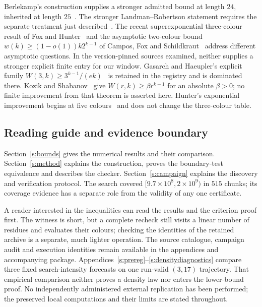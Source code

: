 Berlekamp's construction supplies a stronger admitted bound at length $24$,
inherited at length $25$~\cite{Berlekamp1968}. The stronger
Landman--Robertson statement requires the separate treatment just
described~\cite{LandmanRobertson2004,LandmanRobertson2014,Johannson2007}.
The recent superexponential three-colour result of Fox and
Hunter~\cite{FoxHunter2026} and the asymptotic two-colour bound
$w(k)\ge(1-o(1))k2^{k-1}$ of Campos, Fox and
Schildkraut~\cite{CamposFoxSchildkraut2026} address different asymptotic
questions. In the version-pinned sources examined, neither supplies a
stronger explicit finite entry for our window.
Gasarch and Haeupler's explicit family
$W(3,k)\ge3^{k-1}/(ek)$~\cite[Note~1.7(2)]{GasarchHaeupler2011} is retained
in the registry and is dominated there. Kozik and
Shabanov~\cite[Theorem~2 of the arXiv version]{KozikShabanov2014} give
$W(r,k)\ge\beta r^{k-1}$ for an absolute $\beta>0$; no finite improvement
from that theorem is asserted here. Hunter's exponential improvement begins
at five colours~\cite{Hunter2025} and does not change the three-colour table.

\subsection{Reading guide and evidence boundary}

Section~\ref{s:bounds} gives the numerical results and their comparison.
Section~\ref{s:method} explains the construction, proves the boundary-test
equivalence and describes the checker. Section~\ref{s:campaign} explains
the discovery and verification protocol. The search covered
$[9.7\times10^8,2\times10^9)$ in $515$ chunks; its coverage evidence has a
separate role from the validity of any one certificate.

A reader interested in the inequalities can read the results and the
criterion proof first. The witness is short, but a complete recheck still
visits a linear number of residues and evaluates their colours; checking the
identities of the retained archive is a separate, much lighter operation. The source catalogue, campaign audit and execution
identities remain available in the appendices and accompanying package.
Appendices~\ref{s:prereg}--\ref{s:densitydiagnostics} compare three fixed
search-intensity forecasts on one run-valid $(3,17)$ trajectory. That empirical
comparison neither proves a density law nor enters the lower-bound proof.
No independently administered external replication has been performed; the
preserved local computations and their limits are stated throughout.
